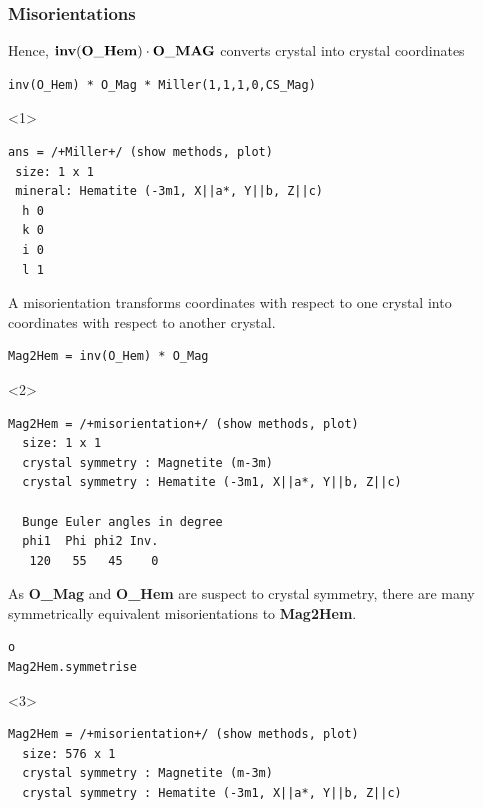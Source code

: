 \documentclass[compress]{beamer}
\begin{document}
\begin{frame}[fragile]
  \frametitle{Misorientations}

  \begin{overlayarea}{\textwidth}{8cm}

  Hence, $\text{\bf inv}(\mathbf{O\_Hem}) \cdot \mathbf{O\_MAG}$ converts crystal  into
  crystal coordinates
  \begin{lstlisting}[style=input]
inv(O_Hem) * O_Mag * Miller(1,1,1,0,CS_Mag)
  \end{lstlisting}
  \begin{onlyenv}<1>
    \vspace{-.3cm}
    \begin{lstlisting}[style=output]
ans = /+Miller+/ (show methods, plot)
 size: 1 x 1
 mineral: Hematite (-3m1, X||a*, Y||b, Z||c)
  h 0
  k 0
  i 0
  l 1

\end{lstlisting}
  \end{onlyenv}

\pause
\medskip

  A \alert{misorientation} transforms coordinates with respect to
  one crystal into coordinates with respect to another crystal.
\begin{lstlisting}[style=input]
Mag2Hem = inv(O_Hem) * O_Mag
\end{lstlisting}

\begin{onlyenv}<2>
  \vspace{-.3cm}
  \begin{lstlisting}[style=output]
Mag2Hem = /+misorientation+/ (show methods, plot)
  size: 1 x 1
  crystal symmetry : Magnetite (m-3m)
  crystal symmetry : Hematite (-3m1, X||a*, Y||b, Z||c)

  Bunge Euler angles in degree
  phi1  Phi phi2 Inv.
   120   55   45    0
\end{lstlisting}
\end{onlyenv}

  \pause

\medskip

As \textbf{O\_Mag} and \textbf{O\_Hem} are suspect to crystal symmetry, there are  many
symmetrically equivalent misorientations to \textbf{Mag2Hem}.

\begin{lstlisting}[style=input]o
Mag2Hem.symmetrise
\end{lstlisting}

\begin{onlyenv}<3>
  \vspace{-.3cm}
  \begin{lstlisting}[style=output]
Mag2Hem = /+misorientation+/ (show methods, plot)
  size: 576 x 1
  crystal symmetry : Magnetite (m-3m)
  crystal symmetry : Hematite (-3m1, X||a*, Y||b, Z||c)
\end{lstlisting}
\end{onlyenv}


\end{overlayarea}
\end{frame}
\end{document}
